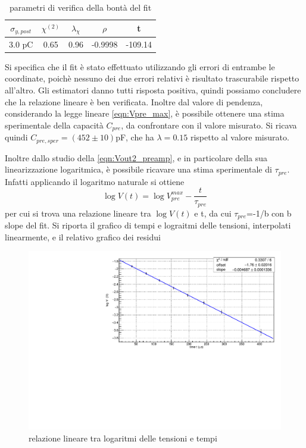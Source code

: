 \documentclass{article}
\begin{document}
\begin{table}[ht]
    \centering
    \begin{tabular}{ccccc}
        \toprule
        $\sigma_{y, post}$    &$\chi^{(2)}$    &$\lambda_{\chi}$   &$\rho$ &t      \\
        \midrule
        3.0 pC                  &0.65            &0.96               &-0.9998&-109.14\\
        \bottomrule
    \end{tabular}
    \caption{parametri di verifica della bontà del fit}
\end{table}

Si specifica che il fit è stato effettuato utilizzando
gli errori di entrambe le coordinate, poichè nessuno dei 
due errori relativi è risultato trascurabile rispetto all'altro.
Gli estimatori danno tutti risposta positiva, quindi possiamo concludere che la relazione lineare è ben verificata.
Inoltre dal valore di pendenza, considerando la legge lineare \ref{eqn:Vpre_max}, è possibile ottenere una stima sperimentale della capacità $C_{pre}$, 
da confrontare con il valore misurato. Si ricava quindi $C_{pre,sper} = (452\pm 10)$pF, che ha $\lambda = 0.15 $ rispetto al valore misurato.

Inoltre dallo studio della \ref{eqn:Vout2_preamp}, e in particolare della sua linearizzazione logaritmica, è possibile ricavare
una stima sperimentale di $\tau_{pre}$. Infatti applicando il logaritmo naturale si ottiene
\begin{equation}
    \log V(t) = \log V_{pre}^{max} - \frac{t}{\tau_{pre}}
\end{equation}
per cui si trova una relazione lineare tra $\log V(t)$ e t, da cui $\tau_{pre}$=-1/b con b slope del fit.
Si riporta il grafico di tempi e lograitmi delle tensioni, interpolati linearmente, e il relativo grafico dei residui

\begin{center}
\begin{figure}[H]
\centering
\includegraphics[scale=0.4, angle=0]{preampRC.pdf}
\caption{relazione lineare tra logaritmi delle tensioni e tempi}
\label{fig:QinvsVsh}
\end{figure}
\end{center}
\end{document}
